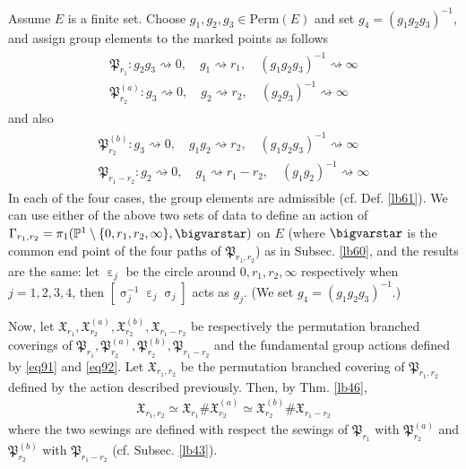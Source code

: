 \documentclass[11pt,b5paper,notitlepage]{article}
\theoremstyle{definition}
\theoremstyle{plain}
\newcommand{\fk}{\mathfrak}
\newcommand{\Pbb}{\mathbb P}
\newcommand{\Perm}{\mathrm{Perm}}
\numberwithin{equation}{subsection}
\begin{document}
Assume $E$ is a finite set.  Choose $g_1,g_2,g_3\in\Perm(E)$ and set $g_4=(g_1g_2g_3)^{-1}$, and assign group elements to the marked points as follows
\begin{gather}\label{eq91}
\begin{array}{c}
\fk P_{r_1}: g_2g_3\rightsquigarrow 0,\quad g_1\rightsquigarrow	r_1,\quad (g_1g_2g_3)^{-1}\rightsquigarrow \infty\\[0.7ex]
\fk P_{r_2}^{(a)}: g_3\rightsquigarrow 0,\quad g_2\rightsquigarrow	r_2,\quad (g_2g_3)^{-1}\rightsquigarrow \infty
\end{array}
\end{gather}
and also
\begin{gather}\label{eq92}
\begin{array}{c}
\fk P_{r_2}^{(b)}: g_3\rightsquigarrow 0,\quad g_1g_2\rightsquigarrow	r_2,\quad (g_1g_2g_3)^{-1}\rightsquigarrow \infty\\[0.7ex]
\fk P_{r_1-r_2}: g_2\rightsquigarrow 0,\quad g_1\rightsquigarrow	r_1-r_2,\quad (g_1g_2)^{-1}\rightsquigarrow \infty
\end{array}
\end{gather}
In each of the four cases, the group elements are admissible (cf. Def. \ref{lb61}). We can use either of the  above two sets of data to define an action of $\Gamma_{r_1,r_2}=\pi_1(\Pbb^1\setminus\{0,r_1,r_2,\infty\},\bigvarstar)$ on $E$ (where $\bigvarstar$ is the common end point of the four paths of $\fk P_{r_1,r_2}$) as in Subsec. \ref{lb60}, and the results are the same: let $\upepsilon_j$ be the circle around $0,r_1,r_2,\infty$ respectively when $j=1,2,3,4$, then $[\upsigma_j^{-1}\upepsilon_j\upsigma_j]$ acts as $g_j$. (We set $g_4=(g_1g_2g_3)^{-1}$.)

Now, let $\fk X_{r_1},\fk X_{r_2}^{(a)},\fk X_{r_2}^{(b)},\fk X_{r_1-r_2}$ be respectively the permutation branched coverings of $\fk P_{r_1},\fk P_{r_2}^{(a)},\fk P_{r_2}^{(b)},\fk P_{r_1-r_2}$ and the fundamental group actions defined by \eqref{eq91} and \eqref{eq92}. Let $\fk X_{r_1,r_2}$ be the permutation branched covering of $\fk P_{r_1,r_2}$ defined by the action described previously. Then, by Thm. \ref{lb46}, 
\begin{align}
\fk X_{r_1,r_2}\simeq \fk X_{r_1}\#\fk X_{r_2}^{(a)}\simeq \fk X_{r_2}^{(b)}\#\fk X_{r_1-r_2}	\label{eq99}
\end{align}
where the two sewings are defined with respect the sewings of $\fk P_{r_1}$ with $\fk P_{r_2}^{(a)}$ and $\fk P_{r_2}^{(b)}$ with $\fk P_{r_1-r_2}$ (cf. Subsec. \ref{lb43}).
\end{document}
